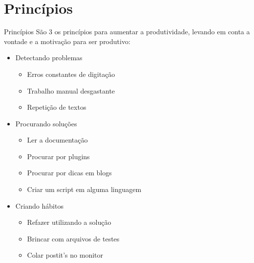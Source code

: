 \section{Princípios}
\begin{frame}{Princípios}
São 3 os princípios para aumentar a produtividade, levando em conta a vontade
e a motivação para ser produtivo:
\begin{itemize}
	\pause \item \large Detectando problemas
	\begin{itemize}
		\item Erros constantes de digitação
		\item Trabalho manual desgastante
		\item Repetição de textos
	\end{itemize}
	\pause \item \large Procurando soluções
	\begin{itemize}
		\item Ler a documentação
		\item Procurar por plugins
		\item Procurar por dicas em blogs
		\item Criar um script em alguma linguagem
	\end{itemize}
	\pause \item \large Criando hábitos
	\begin{itemize}
		\item Refazer utilizando a solução
		\item Brincar com arquivos de testes
		\item Colar postit's no monitor
	\end{itemize}
\end{itemize}
\end{frame}
